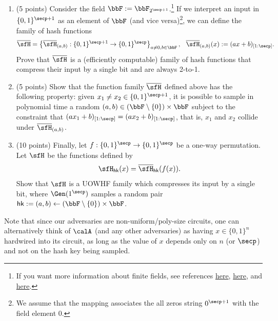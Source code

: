 \documentclass{article}
\newcommand{\hk}{\mathsf{hk}}
\begin{document}
\begin{enumerate}[resume]
    \item (5 points) Consider the field $\bbF := \bbF_{2^{\secp+1}}$.\footnote{If you want more information about finite fields, see references \href{https://www.cs.cmu.edu/~venkatg/teaching/codingtheory/notes/algebra-brief-notes.pdf}{here}, \href{https://ocw.mit.edu/courses/6-451-principles-of-digital-communication-ii-spring-2005/8921c013c1d7802bb197572c52442b97_chap7.pdf}{here}, and \href{https://people.math.harvard.edu/~landesman/assets/finite-fields.pdf}{here}.} If we interpret an input in $\{0, 1\}^{\secp+1}$ as an element of $\bbF$ (and vice versa)\footnote{We assume that the mapping associates the all zeros string $0^{\secp+1}$ with the field element 0.}, we can define the family of hash functions
        \[ \overline{\sfH} = \left\{ \overline{\sfH}_{(a, b)} : \{0, 1\}^{\secp + 1} \rightarrow \{0, 1\}^{\secp} \right\}_{a \neq 0, b \in \bbF}, \hspace{.1in} \overline{\sfH}_{(a, b)}(x) := (ax+b)_{[1:\secp]}. \]
    Prove that $\overline{\sfH}$ is a (efficiently computable) family of hash functions that compress their input by a single bit and are always 2-to-1.
    \item (5 points) Show that the function family $\overline{\sfH}$ defined above has the following property: given $x_1 \neq x_2 \in \{0, 1\}^{\secp+1}$, it is possible to sample in polynomial time a random $(a, b) \in (\bbF \setminus \{0\}) \times \bbF$ subject to the constraint that $(ax_1+b)_{[1:\secp]} = (ax_2+b)_{[1:\secp]}$, that is, $x_1$ and $x_2$ collide under $\overline{\sfH}_{(a, b)}$.
    \item (10 points) Finally, let $f: \{0, 1\}^{\secp} \rightarrow \{0, 1\}^{\secp}$ be a one-way permutation. Let $\sfH$ be the functions defined by
        \[ \sfH_{\hk}(x) = \overline{\sfH}_{\hk}(f(x)). \]
    Show that $\sfH$ is a UOWHF family which compresses its input by a single bit, where $\Gen(1^{\secp})$ samples a random pair $\hk := (a, b) \gets (\bbF \setminus \{0\}) \times \bbF$.
\end{enumerate}
\begin{remark}
    Note that since our adversaries are non-uniform/poly-size circuits, one can alternatively think of $\calA$ (and any other adversaries) as having $x \in \{0, 1\}^{n}$ hardwired into its circuit, as long as the value of $x$ depends only on $n$ (or $\secp$) and not on the hash key being sampled.
\end{remark}
\newpage
\end{document}
